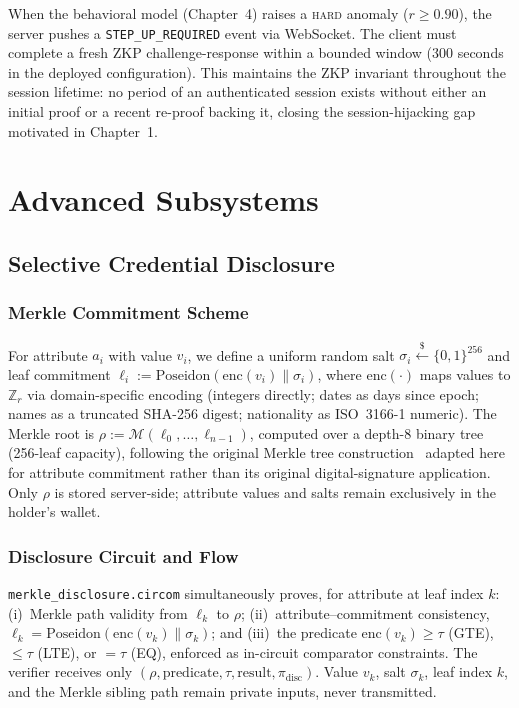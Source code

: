 \documentclass[12pt,a4paper,oneside]{report}
\begin{document}
When the behavioral model (Chapter~4) raises a \textsc{hard} anomaly
($r \geq 0.90$), the server pushes a \texttt{STEP\_UP\_REQUIRED} event via
WebSocket. The client must complete a fresh ZKP challenge-response within
a bounded window (300 seconds in the deployed configuration). This
maintains the ZKP invariant throughout the session lifetime: no period of
an authenticated session exists without either an initial proof or a
recent re-proof backing it, closing the session-hijacking gap motivated
in Chapter~1.

\chapter{Advanced Subsystems}

\section{Selective Credential Disclosure}

\subsection{Merkle Commitment Scheme}

For attribute $a_i$ with value $v_i$, we define a uniform random salt
$\sigma_i \xleftarrow{\$} \{0,1\}^{256}$ and leaf commitment
$\ell_i := \text{Poseidon}\!\left(\text{enc}(v_i) \| \sigma_i\right)$,
where $\text{enc}(\cdot)$ maps values to $\mathbb{Z}_r$ via domain-specific
encoding (integers directly; dates as days since epoch; names as a
truncated SHA-256 digest; nationality as ISO~3166-1 numeric). The Merkle
root is $\rho := \mathcal{M}(\ell_0, \ldots, \ell_{n-1})$, computed over a
depth-8 binary tree (256-leaf capacity), following the original Merkle
tree construction~\cite{merkle88} adapted here for attribute commitment
rather than its original digital-signature application. Only $\rho$ is
stored server-side; attribute values and salts remain exclusively in the
holder's wallet.

\subsection{Disclosure Circuit and Flow}

\texttt{merkle\_disclosure.circom} simultaneously proves, for attribute at
leaf index $k$: (i)~Merkle path validity from $\ell_k$ to $\rho$;
(ii)~attribute--commitment consistency,
$\ell_k = \text{Poseidon}(\text{enc}(v_k) \| \sigma_k)$; and (iii)~the
predicate $\text{enc}(v_k) \geq \tau$ (GTE), $\leq \tau$ (LTE), or
$= \tau$ (EQ), enforced as in-circuit comparator constraints. The verifier
receives only $(\rho, \text{predicate}, \tau, \text{result}, \pi_{\text{disc}})$.
Value $v_k$, salt $\sigma_k$, leaf index $k$, and the Merkle sibling path
remain private inputs, never transmitted.
\end{document}
